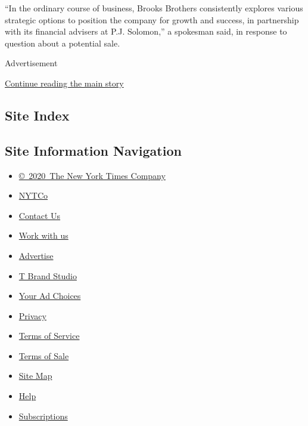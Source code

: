 ``In the ordinary course of business, Brooks Brothers consistently
explores various strategic options to position the company for growth
and success, in partnership with its financial advisers at P.J.
Solomon,'' a spokesman said, in response to question about a potential
sale.

Advertisement

\protect\hyperlink{after-bottom}{Continue reading the main story}

\hypertarget{site-index}{%
\subsection{Site Index}\label{site-index}}

\hypertarget{site-information-navigation}{%
\subsection{Site Information
Navigation}\label{site-information-navigation}}

\begin{itemize}
\tightlist
\item
  \href{https://help.nytimes3xbfgragh.onion/hc/en-us/articles/115014792127-Copyright-notice}{©~2020~The
  New York Times Company}
\end{itemize}

\begin{itemize}
\tightlist
\item
  \href{https://www.nytco.com/}{NYTCo}
\item
  \href{https://help.nytimes3xbfgragh.onion/hc/en-us/articles/115015385887-Contact-Us}{Contact
  Us}
\item
  \href{https://www.nytco.com/careers/}{Work with us}
\item
  \href{https://nytmediakit.com/}{Advertise}
\item
  \href{http://www.tbrandstudio.com/}{T Brand Studio}
\item
  \href{https://www.nytimes3xbfgragh.onion/privacy/cookie-policy\#how-do-i-manage-trackers}{Your
  Ad Choices}
\item
  \href{https://www.nytimes3xbfgragh.onion/privacy}{Privacy}
\item
  \href{https://help.nytimes3xbfgragh.onion/hc/en-us/articles/115014893428-Terms-of-service}{Terms
  of Service}
\item
  \href{https://help.nytimes3xbfgragh.onion/hc/en-us/articles/115014893968-Terms-of-sale}{Terms
  of Sale}
\item
  \href{https://spiderbites.nytimes3xbfgragh.onion}{Site Map}
\item
  \href{https://help.nytimes3xbfgragh.onion/hc/en-us}{Help}
\item
  \href{https://www.nytimes3xbfgragh.onion/subscription?campaignId=37WXW}{Subscriptions}
\end{itemize}
